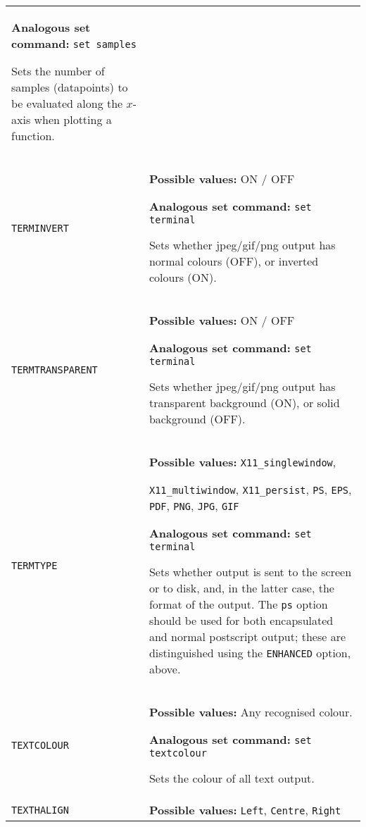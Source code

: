 \begin{longtable}{p{3.4cm}p{9cm}}
                   \textbf{Analogous set command:} \texttt{set samples}\index{set samples command@\texttt{set samples} command}

                   Sets the number of samples (datapoints) to be evaluated along the $x$-axis when plotting a function.
                   \\
\texttt{TERMINVERT} & \textbf{Possible values:} ON / OFF

                   \textbf{Analogous set command:} \texttt{set terminal}\index{set terminal command@\texttt{set terminal} command}

                   Sets whether jpeg/gif/png output has normal colours (OFF), or inverted colours (ON).
                   \\
\texttt{TERMTRANSPARENT} & \textbf{Possible values:} ON / OFF

                   \textbf{Analogous set command:} \texttt{set terminal}\index{set terminal command@\texttt{set terminal} command}

                   Sets whether jpeg/gif/png output has transparent background (ON), or solid background (OFF).
                   \\
\texttt{TERMTYPE} & \textbf{Possible values:} \texttt{X11\_singlewindow},

                   \texttt{X11\_multiwindow}, \texttt{X11\_persist}, \texttt{PS}, \texttt{EPS}, \texttt{PDF}, \texttt{PNG}, \texttt{JPG}, \texttt{GIF}

                   \textbf{Analogous set command:} \texttt{set terminal}\index{set terminal command@\texttt{set terminal} command}

                   Sets whether output is sent to the screen or to disk, and, in the latter case, the format of the output. The \texttt{ps} option should be used for both encapsulated and normal postscript output; these are distinguished using the \texttt{ENHANCED} option, above.
                   \\
\texttt{TEXTCOLOUR} & \textbf{Possible values:} Any recognised colour.

                   \textbf{Analogous set command:} \texttt{set textcolour}\index{set textcolour command@\texttt{set textcolour} command}

                   Sets the colour of all text output.
                   \\
\texttt{TEXTHALIGN} & \textbf{Possible values:} \texttt{Left}, \texttt{Centre}, \texttt{Right}


\end{longtable}
